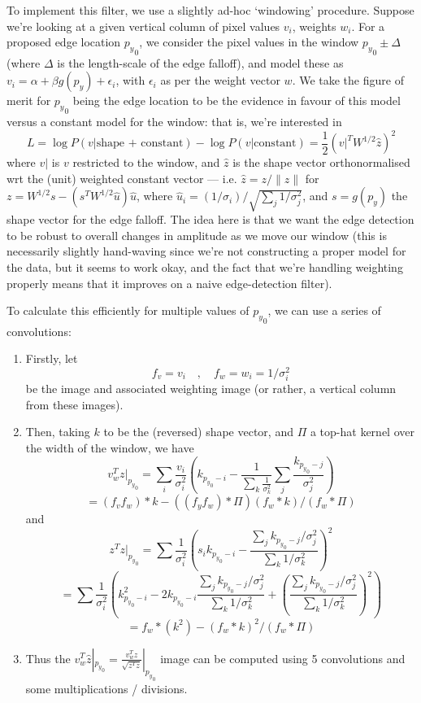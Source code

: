 To implement this filter, we use a slightly ad-hoc `windowing'
procedure. Suppose we're looking at a given vertical column of pixel values
$v_i$, weights $w_i$. For a proposed edge location ${p_y}_0$, we
consider the pixel values in the window ${p_y}_0 \pm \Delta$ (where $\Delta$
is the length-scale of the edge falloff), and model these as $v_i =
\alpha + \beta g(p_y) + \epsilon_i$, with $\epsilon_i$ as per the weight
vector $w$. We take the figure of merit for ${p_y}_0$ being the edge location
to be the evidence in favour of this model versus a constant model for
the window: that is, we're interested in
\[
L = \log P(v|{\mbox{shape + constant}}) - \log P(v|{\mbox{constant}}) = \frac{1}{2} (v|^T W^{1/2} \hat z)^2
\]
where $v|$ is $v$ restricted to the window, and $\hat z$ is the shape
vector orthonormalised wrt the (unit) weighted constant vector --- i.e.
$\hat z = z / \| z \|$ for $z = W^{1/2} s - (s^T W^{1/2} \hat u) \hat
u$, where $\hat u_i = (1/\sigma_i) / \sqrt{\sum_j 1/\sigma_j^2}$, and $s
= g(p_y)$ the shape vector for the edge falloff. The idea here is that
we want the edge detection to be robust to overall changes in amplitude
as we move our window (this is necessarily slightly hand-waving since
we're not constructing a proper model for the data, but it seems to work
okay, and the fact that we're handling weighting properly means that it
improves on a naive edge-detection filter).

To calculate this efficiently for multiple values of ${p_y}_0$, we can
use a series of convolutions:
\begin{enumerate}
\item Firstly, let
\[
f_v = v_i \quad , \quad f_w = w_i = 1/\sigma_i^2
\]
be the image and associated weighting image (or rather, a vertical
column from these images).
%
\item Then, taking $k$ to be the (reversed) shape vector, and $\Pi$ a
top-hat kernel over the width of the window, we have
\[
v_w^T z |_{{p_y}_0} 
= \sum_i \frac{v_i}{\sigma_i^2} \left(k_{{p_y}_0-i} - \frac{1}{\sum_k \frac{1}{\sigma_k^2}}
\sum_j \frac{k_{{p_y}_0-j}}{\sigma_j^2}\right)
\]
\[
= (f_v f_w) * k - ((f_y f_w) * \Pi)(f_w * k) / (f_w * \Pi)
\]
and
\[
z^T z |_{{p_y}_0}
= 
\sum \frac{1}{\sigma_i^2}\left(s_i k_{{p_y}_0-i} - \frac{\sum_j k_{{p_y}_0-j}/\sigma_j^2}
{\sum_k 1/\sigma_k^2}\right)^2
\]
\[
=
\sum \frac{1}{\sigma_i^2}\left(k_{{p_y}_0-i}^2 - 2 k_{{p_y}_0-i} \frac{\sum_j k_{{p_y}_0-j}/\sigma_j^2}
{\sum_k 1/\sigma_k^2} + \left(\frac{\sum_j k_{{p_y}_0-j}/\sigma_j^2}
{\sum_k 1/\sigma_k^2}\right)^2\right)
\]
\[
 = f_w * (k^2) - (f_w * k)^2 / (f_w * \Pi)
\]
%
\item Thus the $v_w^T \hat z |_{{p_y}_0} = \frac{v_w^T z}{\sqrt{z^T z}}|_{{p_y}_0}$ image
can be computed using 5 convolutions and some multiplications / divisions.
\end{enumerate}

